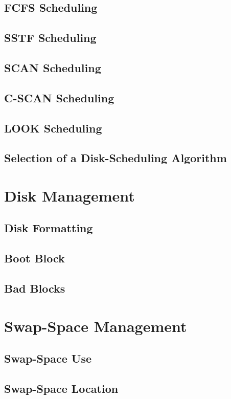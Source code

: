 \documentclass[12pt]{article}
\begin{document}
\subsection{FCFS Scheduling}

\subsection{SSTF Scheduling}
\subsection{SCAN Scheduling}
\subsection{C-SCAN Scheduling}
\subsection{LOOK Scheduling}
\subsection{Selection of a Disk-Scheduling Algorithm}
\section{Disk Management}
\subsection{Disk Formatting}
\subsection{Boot Block}
\subsection{Bad Blocks}
\section{Swap-Space Management}
\subsection{Swap-Space Use}
\subsection{Swap-Space Location}
\end{document}
